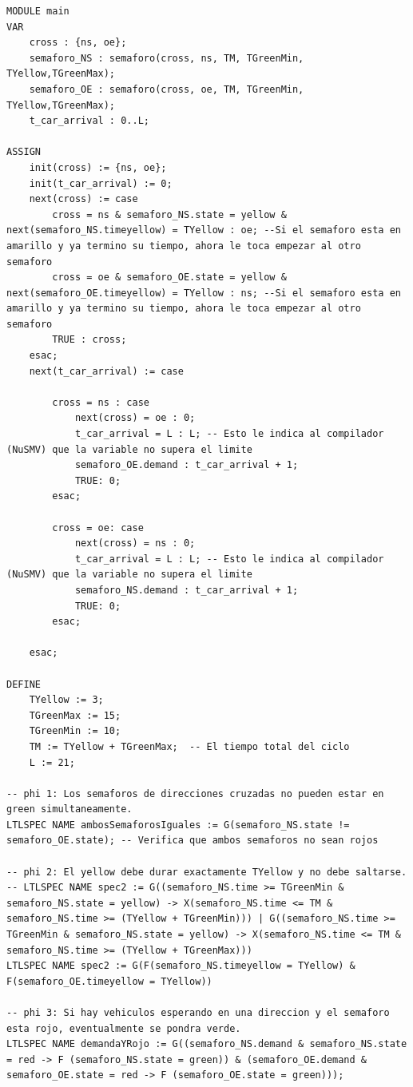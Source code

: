 \begin{lstlisting}[language=NuSMV, caption={Modelo con tiempo de espera}]
MODULE main
VAR
    cross : {ns, oe};
    semaforo_NS : semaforo(cross, ns, TM, TGreenMin, TYellow,TGreenMax);
    semaforo_OE : semaforo(cross, oe, TM, TGreenMin, TYellow,TGreenMax);
    t_car_arrival : 0..L;
    
ASSIGN
    init(cross) := {ns, oe};
    init(t_car_arrival) := 0;
    next(cross) := case
        cross = ns & semaforo_NS.state = yellow & next(semaforo_NS.timeyellow) = TYellow : oe; --Si el semaforo esta en amarillo y ya termino su tiempo, ahora le toca empezar al otro semaforo
        cross = oe & semaforo_OE.state = yellow & next(semaforo_OE.timeyellow) = TYellow : ns; --Si el semaforo esta en amarillo y ya termino su tiempo, ahora le toca empezar al otro semaforo
        TRUE : cross;
    esac;
    next(t_car_arrival) := case
        
        cross = ns : case
            next(cross) = oe : 0;
            t_car_arrival = L : L; -- Esto le indica al compilador (NuSMV) que la variable no supera el limite
            semaforo_OE.demand : t_car_arrival + 1;
            TRUE: 0; 
        esac;
        
        cross = oe: case
            next(cross) = ns : 0;
            t_car_arrival = L : L; -- Esto le indica al compilador (NuSMV) que la variable no supera el limite
            semaforo_NS.demand : t_car_arrival + 1;
            TRUE: 0;
        esac;
        
    esac;
    
DEFINE
    TYellow := 3; 
    TGreenMax := 15;
    TGreenMin := 10;
    TM := TYellow + TGreenMax;  -- El tiempo total del ciclo
    L := 21;

-- phi 1: Los semaforos de direcciones cruzadas no pueden estar en green simultaneamente.
LTLSPEC NAME ambosSemaforosIguales := G(semaforo_NS.state != semaforo_OE.state); -- Verifica que ambos semaforos no sean rojos

-- phi 2: El yellow debe durar exactamente TYellow y no debe saltarse.
-- LTLSPEC NAME spec2 := G((semaforo_NS.time >= TGreenMin & semaforo_NS.state = yellow) -> X(semaforo_NS.time <= TM & semaforo_NS.time >= (TYellow + TGreenMin))) | G((semaforo_NS.time >= TGreenMin & semaforo_NS.state = yellow) -> X(semaforo_NS.time <= TM & semaforo_NS.time >= (TYellow + TGreenMax)))
LTLSPEC NAME spec2 := G(F(semaforo_NS.timeyellow = TYellow) & F(semaforo_OE.timeyellow = TYellow))

-- phi 3: Si hay vehiculos esperando en una direccion y el semaforo esta rojo, eventualmente se pondra verde.
LTLSPEC NAME demandaYRojo := G((semaforo_NS.demand & semaforo_NS.state = red -> F (semaforo_NS.state = green)) & (semaforo_OE.demand & semaforo_OE.state = red -> F (semaforo_OE.state = green)));


\end{lstlisting}
